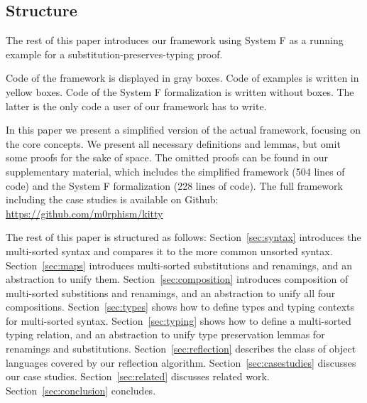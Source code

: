 \documentclass[a4paper, UKenglish, cleveref, autoref, thm-restate]{lipics-v2021}
\begin{document}
  \subsection{Structure}
  \label{sec:introduction:structure}

  The rest of this paper introduces our framework using System F
  as a running example for a substitution-preserves-typing proof.

  Code of the framework is displayed in gray boxes.
  Code of examples is written in yellow boxes.
  Code of the System F formalization is written without boxes. The
  latter is the only code a user of our framework has to write.

  In this paper we present a simplified version of the actual
  framework, focusing on the core concepts. We present all necessary
  definitions and lemmas, but omit some proofs for the sake of
  space. The omitted proofs can be found in our supplementary material,
  which includes the simplified framework (504 lines of code) and the
  System F formalization (228 lines of code).
  The full framework including the case studies is available on Github: \textcolor{blue}{\url{https://github.com/m0rphism/kitty}}

  The rest of this paper is structured as follows:
  Section~\ref{sec:syntax} introduces the multi-sorted syntax and compares it to the
  more common unsorted syntax.
  Section~\ref{sec:maps} introduces multi-sorted substitutions and renamings, and
  an abstraction to unify them.
  Section~\ref{sec:composition} introduces composition of multi-sorted
  substitions and renamings, and an abstraction to unify all four
  compositions.
  Section~\ref{sec:types} shows how to define types
  and typing contexts for multi-sorted syntax.
  Section~\ref{sec:typing} shows how to define a multi-sorted typing relation,
  and an abstraction to unify type preservation lemmas for renamings and substitutions.
  Section~\ref{sec:reflection} describes the class of object languages covered by
  our reflection algorithm.
  Section~\ref{sec:casestudies} discusses our case studies.
  Section~\ref{sec:related} discusses related work.
  Section~\ref{sec:conclusion} concludes.
\end{document}
